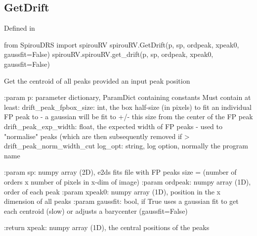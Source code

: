 \noindent\begin{minipage}{\textwidth}
\subsection{GetDrift}

Defined in \spirouRV{}

\begin{pythonbox}
from SpirouDRS import spirouRV
spirouRV.GetDrift(p, sp, ordpeak, xpeak0, gaussfit=False)
spirouRV.spirouRV.get_drift(p, sp, ordpeak, xpeak0, gaussfit=False)
\end{pythonbox}

\begin{pythondocstring}
Get the centroid of all peaks provided an input peak position

:param p: parameter dictionary, ParamDict containing constants
    Must contain at least:
            drift_peak_fpbox_size: int, the box half-size (in pixels) to
                                   fit an individual FP peak to - a
                                   gaussian will be fit to +/- this size
                                   from the center of the FP peak
            drift_peak_exp_width: float, the expected width of FP peaks -
                                  used to "normalise" peaks (which are then
                                  subsequently removed if >
                                  drift_peak_norm_width_cut
            log_opt: string, log option, normally the program name

:param sp: numpy array (2D), e2ds fits file with FP peaks
           size = (number of orders x number of pixels in x-dim of image)
:param ordpeak: numpy array (1D), order of each peak
:param xpeak0: numpy array (1D), position in the x dimension of all peaks
:param gaussfit: bool, if True uses a gaussian fit to get each centroid
                 (slow) or adjusts a barycenter (gaussfit=False)

:return xpeak: numpy array (1D), the central positions of the peaks
\end{pythondocstring}
\end{minipage}

